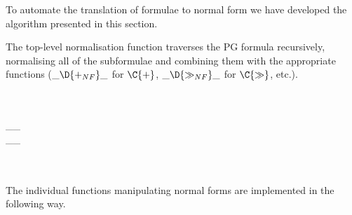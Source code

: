 To automate the translation of formulae to normal form we have developed the algorithm presented in this section.


The top-level normalisation function traverses the PG formula recursively, normalising all of the subformulae and combining them with the appropriate functions (\ensuremath{\_\D{+_{NF}}\_} for \ensuremath{\C{+}}, \ensuremath{\_\D{\seq_{NF}}\_} for \ensuremath{\C{\seq}}, etc.).

\begin{hscode}\SaveRestoreHook
{}%
%
%
%
\>[3]{}\;\mathbin{:}\;\;\;\<[E]%
\\
\>[3]{}\;\mathrel{=}\;\;{}\<[E]%
\\
\>[3]{}\<[17]%
\>[17]{}\_\_\;{}\<[E]%
\\
\>[3]{}\<[17]%
\>[17]{}\_\_\;{}\<[E]%
\\
\>[3]{}\<[17]%
\>[17]{}\C{[}\C{]}\;{}\<[E]%
\\
\>[3]{}\<[17]%
\>[17]{}\;{}\<[E]%
\\
\>[3]{}\<[17]%
\>[17]{}\<[E]%
\ColumnHook
\end{hscode}\resethooks

The individual functions manipulating normal forms are implemented in the following way.

